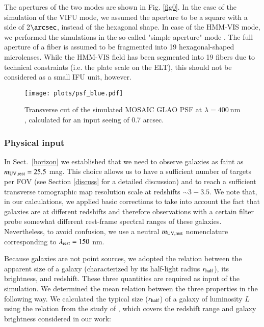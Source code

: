 \documentclass{aa}
\begin{document}
The apertures of the two modes are shown in Fig. \ref{fig0}. In the case of the simulation of the VIFU mode, we assumed the aperture to be a square with a side of 2$\arcsec$, instead of the hexagonal shape. In case of the HMM-VIS mode, we performed the simulations in the so-called "simple aperture" mode \citep{Puech2016}. The full aperture of a fiber is assumed to be fragmented into 19 hexagonal-shaped microlenses. While the HMM-VIS field has been segmented into 19 fibers due to technical constraints (i.e. the plate scale on the ELT), this should not be considered as a small IFU unit, however.

\begin{figure}
\begin{center}
\texttt{[image: plots/psf\_blue.pdf]}
\caption{Transverse cut of the simulated MOSAIC GLAO PSF at $\lambda = 400 ~\mathrm{nm}$, calculated for an input seeing of 0.7 arcsec.}
\label{fig01}
\end{center}
\end{figure}


\subsubsection{Physical input}

In Sect.~\ref{horizon} we established that we need to observe galaxies as faint as $m_{\rm UV,rest} = 25.5$ mag. This choice allows us to have a sufficient number of targets per FOV (see Section \ref{discuss} for a detailed discussion) and to reach a sufficient transverse tomographic map resolution scale at redshifts $\sim 3 - 3.5$. We note that, in our calculations, we applied basic corrections to take into account the fact that galaxies are at different redshifts and therefore observations with a certain filter probe somewhat different rest-frame spectral ranges of these galaxies. Nevertheless, to avoid confusion, we use a neutral $m_{\rm UV,rest}$ nomenclature corresponding to $\lambda_{\rm rest} = 150$ nm.

Because galaxies are not point sources, we adopted the relation between the apparent size of a galaxy (characterized by its half-light radius $r_{\rm half}$), its brightness, and redshift. These three quantities are required as input of the simulation. We determined the mean relation between the three properties in the following way. We calculated the typical size ($r_{\rm half}$) of a galaxy of luminosity $L$ using the relation from the study of \citet{Shibuya2015}, which  covers the redshift range and galaxy brightness considered in our work:
\end{document}
